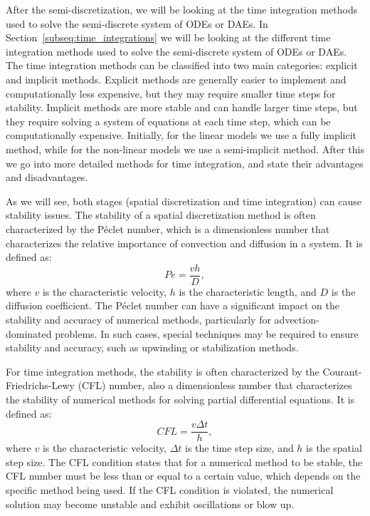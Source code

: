 After the semi-discretization, we will be looking at the time integration methods used to solve the semi-discrete system of ODEs or DAEs. In Section~\ref{subseq:time_integrations} we will be looking at the different time integration methods used to solve the semi-discrete system of ODEs or DAEs. The time integration methods can be classified into two main categories: explicit and implicit methods. Explicit methods are generally easier to implement and computationally less expensive, but they may require smaller time steps for stability. Implicit methods are more stable and can handle larger time steps, but they require solving a system of equations at each time step, which can be computationally expensive. Initially, for the linear models we use a fully implicit method, while for the non-linear models we use a semi-implicit method. After this we go into more detailed methods for time integration, and state their advantages and disadvantages.

As we will see, both stages (spatial discretization and time integration) can cause stability issues. The stability of a spatial discretization method is often characterized by the P\'eclet number, which is a dimensionless number that characterizes the relative importance of convection and diffusion in a system. It is defined as:
\begin{equation}\label{eq:num_peclet}
    Pe = \frac{vh}{D},
\end{equation}
where $v$ is the characteristic velocity, $h$ is the characteristic length, and $D$ is the diffusion coefficient. The P\'eclet number can have a significant impact on the stability and accuracy of numerical methods, particularly for advection-dominated problems. In such cases, special techniques may be required to ensure stability and accuracy, such as upwinding or stabilization methods.

For time integration methods, the stability is often characterized by the Courant-Friedrichs-Lewy (CFL) number, also a dimensionless number that characterizes the stability of numerical methods for solving partial differential equations. It is defined as:
\begin{equation}\label{eq:num_cfl}
    CFL = \frac{v\Delta t}{h},
\end{equation}
where $v$ is the characteristic velocity, $\Delta t$ is the time step size, and $h$ is the spatial step size. The CFL condition states that for a numerical method to be stable, the CFL number must be less than or equal to a certain value, which depends on the specific method being used. If the CFL condition is violated, the numerical solution may become unstable and exhibit oscillations or blow up.

